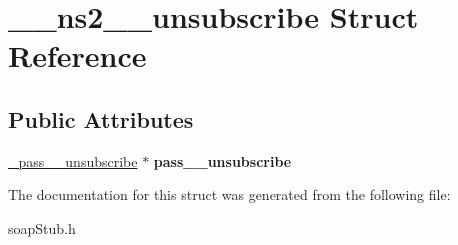 \hypertarget{struct____ns2____unsubscribe}{
\section{\_\-\_\-ns2\_\-\_\-unsubscribe Struct Reference}
\label{struct____ns2____unsubscribe}
}
\subsection*{Public Attributes}
\begin{DoxyCompactItemize}
\item 
\hypertarget{struct____ns2____unsubscribe_a39d2a9ac1e934567b8a53c91f42d7b5c}{
\hyperlink{class__pass____unsubscribe}{\_\-pass\_\-\_\-unsubscribe} $\ast$ {\bfseries pass\_\-\_\-unsubscribe}}
\label{struct____ns2____unsubscribe_a39d2a9ac1e934567b8a53c91f42d7b5c}

\end{DoxyCompactItemize}


The documentation for this struct was generated from the following file:\begin{DoxyCompactItemize}
\item 
soapStub.h\end{DoxyCompactItemize}
